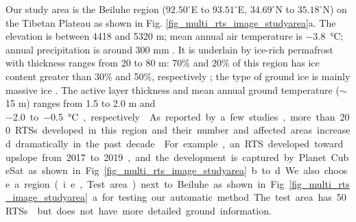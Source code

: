 \documentclass[authoryear,preprint,review,12pt]{elsarticle}
\begin{document}
Our study area is the Beiluhe region ($92.50^\circ$E to $93.51^\circ$E, $34.69^\circ$N to $35.18^\circ$N) on the Tibetan Plateau as shown in Fig. \ref{fig_multi_rts_image_studyarea}a.
The elevation is between 4418 and 5320 m; mean annual air temperature is \SI{-3.8}{\celsius}; annual precipitation is around 300 mm  \citep{luo_thermokarst_2015}.
It is underlain by ice-rich permafrost with thickness ranges from 20 to 80 m: 70\% and 20\% of this region has ice content greater than 30\% and 50\%, respectively \citep{zhou_geocryology_2000, luo_thermokarst_2015}; 
the type of ground ice is mainly massive ice \citep{guodong1983mechanism}. 
The active layer thickness and mean annual ground temperature ($\sim$15 m) ranges from 1.5 to 2.0 m and \SI{-2.0} to \SI{-0.5}{\celsius}, respectively \citep{zhou_geocryology_2000, wu2010changes, luo_thermokarst_2015,  wu2015changes}. 
As reported by a few studies, more than 200 RTSs developed in this region and their number and affected areas increased dramatically in the past decade \citep{huang2020using,luo2019recent}.  
For example, an RTS developed toward upslope from 2017 to 2019, and the development is captured by Planet CubeSat as shown in Fig. \ref{fig_multi_rts_image_studyarea} b to d. 
We also choose a region (i.e., Test area) next to Beiluhe as shown in Fig. \ref{fig_multi_rts_image_studyarea}a for testing our automatic method. 
The test area has 50 RTSs \citep{huang2020using} but does not have more detailed ground information. 


\end{document}
